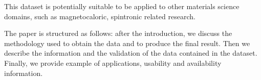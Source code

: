 \documentclass[a4paper,10pt]{article}
\begin{document}
This dataset is potentially suitable to be applied to other materials science domains, such as magnetocaloric, spintronic related research. 

The paper is structured as follows: after the introduction, we discuss the methodology used to obtain the data and to produce the final result. Then we describe the information and the validation of the data contained in the dataset. Finally, we provide example of applications, usability and availability information. 










\end{document}
